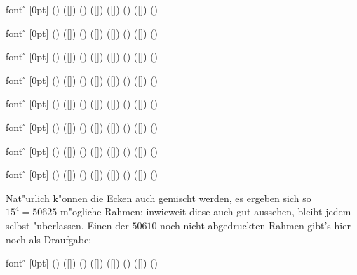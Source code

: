 \begin{bsp}
         font {\G} [0pt]
         () ([]) ()
         ([])        ([])
         () ([]) ()
\end{bsp}
\make

\begin{bsp}
         font {\G} [0pt]
         () ([]) ()
         ([])        ([])
         () ([]) ()
\end{bsp}
\make

\begin{bsp}
         font {\G} [0pt]
         () ([]) ()
         ([])        ([])
         () ([]) ()
\end{bsp}
\make

\begin{bsp}
         font {\G} [0pt]
         () ([]) ()
         ([])        ([])
         () ([]) ()
\end{bsp}
\make

\begin{bsp}
         font {\G} [0pt]
         () ([]) ()
         ([])        ([])
         () ([]) ()
\end{bsp}
\make

\begin{bsp}
         font {\G} [0pt]
         () ([]) ()
         ([])        ([])
         () ([]) ()
\end{bsp}
\make

\begin{bsp}
         font {\G} [0pt]
         () ([]) ()
         ([])        ([])
         () ([]) ()
\end{bsp}
\make

\begin{bsp}
         font {\G} [0pt]
         () ([]) ()
         ([])        ([])
         () ([]) ()
\end{bsp}
\make

\vskip2mm
Nat"urlich k"onnen die Ecken auch gemischt werden, es ergeben sich so $15^4=50625$
m"ogliche Rahmen; inwieweit diese auch gut aussehen, bleibt jedem selbst
"uberlassen. Einen der $50610$ noch nicht abgedruckten Rahmen gibt's hier
noch als Draufgabe:
\begin{bsp}
         font {\G} [0pt]
         () ([]) ()
         ([])        ([])
         () ([]) ()
\end{bsp}
\make

